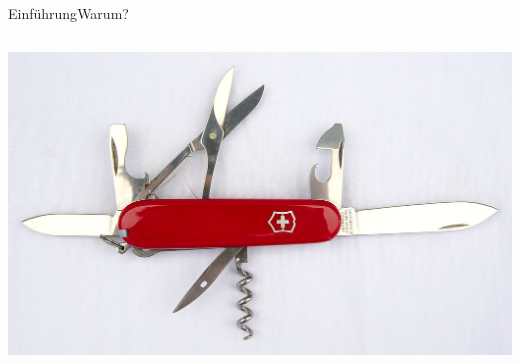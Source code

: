 \documentclass[t,aspectratio=169,divpsnames]{beamer}
\begin{document}
\begin{frame}{Einführung}{Warum?}
\begin{columns}
\begin{column}{0.5\textwidth}
{			}
			\only<4>
			{
				\center
				\includegraphics[width=\textwidth]{img/Funktionsumfang.jpg}
			}
		\end{column}
	\end{columns}
\end{frame}
\end{document}

